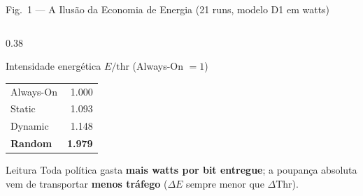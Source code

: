 \documentclass[aspectratio=169,10pt,xcolor={dvipsnames,table}]{beamer}
\begin{document}
\begin{frame}{Fig.\ 1 --- A Ilus\~ao da Economia de Energia (21 runs, modelo D1 em watts)}
\begin{columns}[T]
\begin{column}{0.38\textwidth}
\begin{block}{Intensidade energética $E/\text{thr}$ (Always-On $=1$)}
\begin{tabular}{lr}
          \toprule
          Always-On & 1.000 \\
          Static    & 1.093 \\
          Dynamic   & 1.148 \\
          \rowcolor{alertred!15}\textbf{Random} & \textbf{1.979} \\
          \bottomrule
        \end{tabular}
      \end{block}
      \begin{exampleblock}{Leitura}
        \small Toda política gasta \textbf{mais watts por bit entregue};
        a poupança absoluta vem de transportar \textbf{menos tráfego}
        ($\Delta E$ sempre menor que $\Delta\text{Thr}$).
      \end{exampleblock}
    \end{column}
  \end{columns}
\end{frame}
\end{document}
